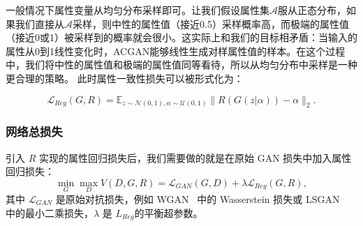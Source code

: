 

一般情况下属性变量从均匀分布采样即可。让我们假设属性集$\mathcal{A}$服从正态分布，如果我们直接从$\mathcal{A}$采样，则中性的属性值（接近0.5）采样概率高，而极端的属性值（接近0或1）被采样到的概率就会很小。这实际上和我们的目标相矛盾：当输入的属性从0到1线性变化时，ACGAN能够线性生成对样属性值的样本。在这个过程中，我们将中性的属性值和极端的属性值同等看待，所以从均匀分布中采样是一种更合理的策略。
此时属性一致性损失可以被形式化为：

\begin{equation}
     \mathcal{L}_{Reg}(G, R)  =  \mathbb{E}_{z \sim \mathcal{N}(0,1), \alpha \sim \mathcal{U}(0,1)}\|R(G(z|\alpha)) - \alpha\|_2.
\end{equation}

\subsubsection{网络总损失}
引入 $R$ 实现的属性回归损失后，我们需要做的就是在原始 GAN 损失中加入属性回归损失：
\begin{equation}
     \min _{G} \max _{D} V(D, G, R) = \mathcal{L}_{GAN}(G, D) + \lambda \mathcal{L}_{Reg}(G, R),
     \label{overall}
\end{equation}
其中 $\mathcal{L}_{GAN}$ 是原始对抗损失，例如 WGAN~\cite{wgan} 中的 Wasserstein 损失或 LSGAN~\cite{lsgan} 中的最小二乘损失，$\lambda$ 是 $L_{Reg}$的平衡超参数。

